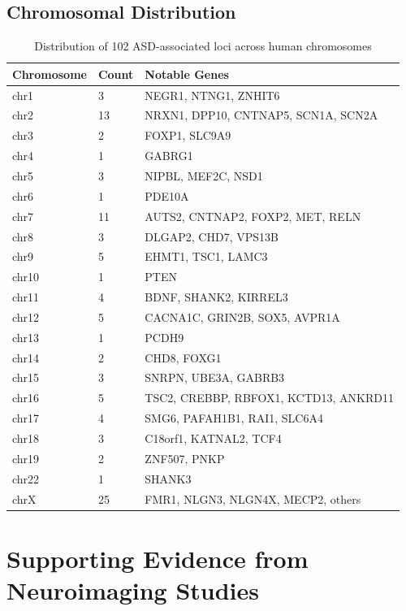 \documentclass[12pt]{article}
\begin{document}
\subsection{Chromosomal Distribution}

\begin{table}[h]
\centering
\caption{Distribution of 102 ASD-associated loci across human chromosomes}
\begin{tabular}{lll}
\toprule
\textbf{Chromosome} & \textbf{Count} & \textbf{Notable Genes} \\
\midrule
chr1 & 3 & NEGR1, NTNG1, ZNHIT6 \\
chr2 & 13 & NRXN1, DPP10, CNTNAP5, SCN1A, SCN2A \\
chr3 & 2 & FOXP1, SLC9A9 \\
chr4 & 1 & GABRG1 \\
chr5 & 3 & NIPBL, MEF2C, NSD1 \\
chr6 & 1 & PDE10A \\
chr7 & 11 & AUTS2, CNTNAP2, FOXP2, MET, RELN \\
chr8 & 3 & DLGAP2, CHD7, VPS13B \\
chr9 & 5 & EHMT1, TSC1, LAMC3 \\
chr10 & 1 & PTEN \\
chr11 & 4 & BDNF, SHANK2, KIRREL3 \\
chr12 & 5 & CACNA1C, GRIN2B, SOX5, AVPR1A \\
chr13 & 1 & PCDH9 \\
chr14 & 2 & CHD8, FOXG1 \\
chr15 & 3 & SNRPN, UBE3A, GABRB3 \\
chr16 & 5 & TSC2, CREBBP, RBFOX1, KCTD13, ANKRD11 \\
chr17 & 4 & SMG6, PAFAH1B1, RAI1, SLC6A4 \\
chr18 & 3 & C18orf1, KATNAL2, TCF4 \\
chr19 & 2 & ZNF507, PNKP \\
chr22 & 1 & SHANK3 \\
chrX & 25 & FMR1, NLGN3, NLGN4X, MECP2, others \\
\bottomrule
\end{tabular}
\end{table}

\section{Supporting Evidence from Neuroimaging Studies}
\end{document}
